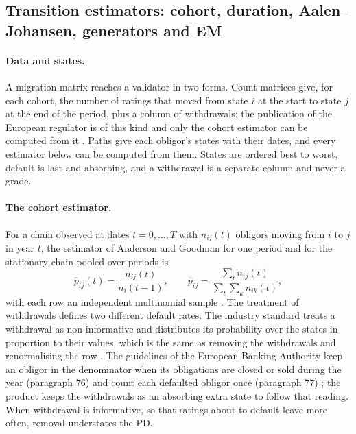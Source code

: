 \subsection{Transition estimators: cohort, duration, Aalen--Johansen, generators and EM}
\label{sec:m9}

\paragraph{Data and states.} A migration matrix reaches a validator in two forms. Count matrices give, for each cohort, the number of ratings that moved from state $i$ at the start to state $j$ at the end of the period, plus a column of withdrawals; the publication of the European regulator is of this kind and only the cohort estimator can be computed from it \citep{ratings:cerep}. Paths give each obligor's states with their dates, and every estimator below can be computed from them. States are ordered best to worst, default is last and absorbing, and a withdrawal is a separate column and never a grade.

\paragraph{The cohort estimator.} For a chain observed at dates $t=0,\dots,T$ with $n_{ij}(t)$ obligors moving from $i$ to $j$ in year $t$, the estimator of Anderson and Goodman for one period and for the stationary chain pooled over periods is
\begin{equation}
\hat p_{ij}(t)=\frac{n_{ij}(t)}{n_i(t-1)},\qquad
\hat p_{ij}=\frac{\sum_{t}n_{ij}(t)}{\sum_{t}\sum_{k}n_{ik}(t)},
\label{eq:ratings-cohort}
\end{equation}
with each row an independent multinomial sample \citep{ratings:andersongoodman1957}. The treatment of withdrawals defines two different default rates. The industry standard treats a withdrawal as non-informative and distributes its probability over the states in proportion to their values, which is the same as removing the withdrawals and renormalising the row \citep{ratings:schuermann2004}. The guidelines of the European Banking Authority keep an obligor in the denominator when its obligations are closed or sold during the year (paragraph 76) and count each defaulted obligor once (paragraph 77) \citep{ratings:eba2017}; the product keeps the withdrawals as an absorbing extra state to follow that reading. When withdrawal is informative, so that ratings about to default leave more often, removal understates the PD.

